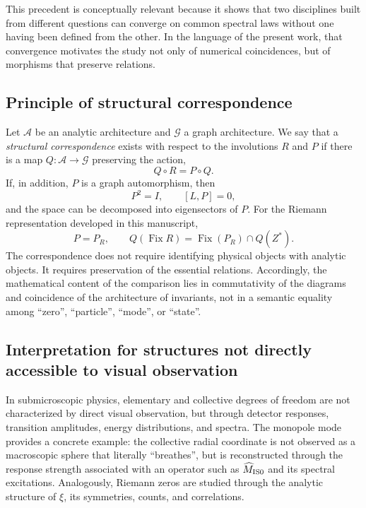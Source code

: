 \documentclass[11pt]{amsart}
\theoremstyle{definition}
\theoremstyle{remark}
\begin{document}
This precedent is conceptually relevant because it shows that two disciplines built from different questions can converge on common spectral laws without one having been defined from the other. In the language of the present work, that convergence motivates the study not only of numerical coincidences, but of morphisms that preserve relations.

\subsection{Principle of structural correspondence}
Let $\mathcal A$ be an analytic architecture and $\mathcal G$ a graph architecture. We say that a \emph{structural correspondence} exists with respect to the involutions $R$ and $P$ if there is a map $Q:\mathcal A\to\mathcal G$ preserving the action,
\begin{equation}\label{eq:structcorr}
 \boxed{Q\circ R=P\circ Q.}
\end{equation}
If, in addition, $P$ is a graph automorphism, then
\begin{equation}\label{eq:structcorrLap}
 P^2=I,\qquad [L,P]=0,
\end{equation}
and the space can be decomposed into eigensectors of $P$. For the Riemann representation developed in this manuscript,
\begin{equation}
 P=P_R,\qquad Q(\operatorname{Fix}R)=\operatorname{Fix}(P_R)\cap Q(Z^*).
\end{equation}
The correspondence does not require identifying physical objects with analytic objects. It requires preservation of the essential relations. Accordingly, the mathematical content of the comparison lies in commutativity of the diagrams and coincidence of the architecture of invariants, not in a semantic equality among ``zero'', ``particle'', ``mode'', or ``state''.

\subsection{Interpretation for structures not directly accessible to visual observation}
In submicroscopic physics, elementary and collective degrees of freedom are not characterized by direct visual observation, but through detector responses, transition amplitudes, energy distributions, and spectra. The monopole mode provides a concrete example: the collective radial coordinate is not observed as a macroscopic sphere that literally ``breathes'', but is reconstructed through the response strength associated with an operator such as $\widehat M_{\rm IS0}$ and its spectral excitations. Analogously, Riemann zeros are studied through the analytic structure of $\xi$, its symmetries, counts, and correlations.
\end{document}
